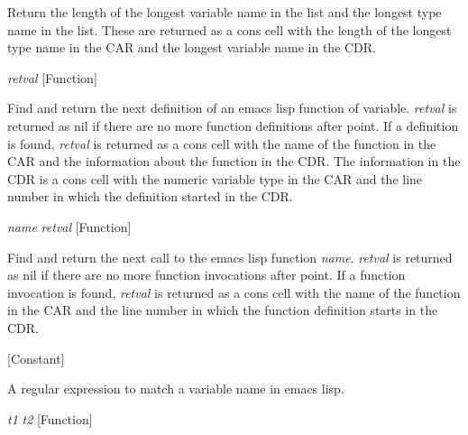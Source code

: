 \begin{doc-string}
 Return the length of the longest variable name in the list and the longest type
name in the list.  These are returned as a cons cell with the length of the longest
type name in the CAR and the longest variable name in the CDR.
\end{doc-string}

\vspace{1em}
\noindent
{}
\usebox{\funcname}\emph{retval}
 \hfill [Function]

\begin{doc-string}
Find and return the next definition of an emacs lisp function of variable.
   \emph{retval} is returned
as nil if there are no more function definitions after point.  If a definition
is found, \emph{retval} is returned as a cons cell with the name of the function
in the CAR and the information about the function in the CDR.  The information in the
CDR is a cons cell with the numeric variable type in the CAR and the line number in
which the definition started in the CDR.
\end{doc-string}

\vspace{1em}
\noindent
{}
\usebox{\funcname}\emph{name} \emph{retval}
 \hfill [Function]

\begin{doc-string}
Find and return the next call to the emacs lisp function \emph{name}.  \emph{retval} is returned
as nil if there are no more function invocations after point.  If a function
invocation is found, \emph{retval} is returned as a cons cell with the name of the function
in the CAR and the line number in which the function definition starts in the CDR.
\end{doc-string}

\vspace{1em}
\noindent
{}
\usebox{\funcname}
 \hfill [Constant]

\begin{doc-string}
A regular expression to match a variable name in emacs lisp.
\end{doc-string}

\vspace{1em}
\noindent
{}
\usebox{\funcname}\emph{t1} \emph{t2}
 \hfill [Function]

